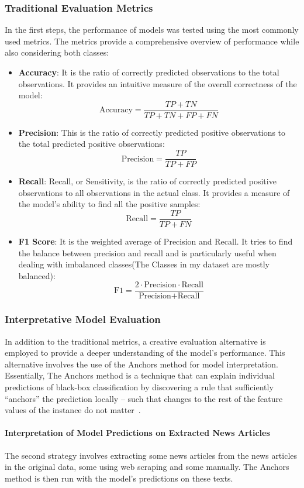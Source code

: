 \documentclass[11pt,a4paper]{article}
\begin{document}
\subsubsection{Traditional Evaluation Metrics}
In the first steps, the performance of models was tested using the most commonly used metrics. The metrics provide a comprehensive overview of performance while also considering both classes:
\begin{itemize}
    \item \textbf{Accuracy}: It is the ratio of correctly predicted observations to the total observations. It provides an intuitive measure of the overall correctness of the model:
    $$
    \text{Accuracy} = \frac{TP+TN}{TP+TN+FP+FN}
    $$
    \item \textbf{Precision}: This is the ratio of correctly predicted positive observations to the total predicted positive observations:
    $$
    \text{Precision} = \frac{TP}{TP+FP}
    $$
    \item \textbf{Recall}: Recall, or Sensitivity, is the ratio of correctly predicted positive observations to all observations in the actual class. It provides a measure of the model’s ability to find all the positive samples:
    $$
    \text{Recall} = \frac{TP}{TP+FN}
    $$
    \item \textbf{F1 Score}: It is the weighted average of Precision and Recall. It tries to find the balance between precision and recall and is particularly useful when dealing with imbalanced classes(The Classes in my dataset are mostly balanced):
    $$
    \text{F1} = \frac{2 \cdot \text{Precision} \cdot \text{Recall}}{\text{Precision} + \text{Recall}}
    $$
\end{itemize}
\subsubsection{Interpretative Model Evaluation}
In addition to the traditional metrics, a creative evaluation alternative is employed to provide a deeper understanding of the model’s performance. This alternative involves the use of the Anchors method for model interpretation.
Essentially, The Anchors method is a technique that can explain individual predictions of black-box classification by discovering a rule that sufficiently “anchors” the prediction locally – such that changes to the rest of the feature values of the instance do not matter~\cite{ribeiro_2018_anchors}.

\paragraph{Interpretation of Model Predictions on Extracted News Articles}
The second strategy involves extracting some news articles from the news articles in the original data, some using web scraping and some manually. The Anchors method is then run with the model’s predictions on these texts. 
\end{document}
